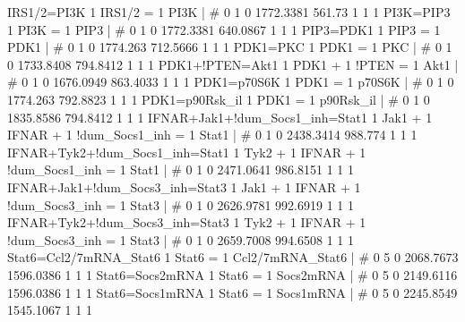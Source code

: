 IRS1/2=PI3K                                         	1 IRS1/2 = 1 PI3K 	| 	# 	0              1              0      1772.3381         561.73              1              1              1 
PI3K=PIP3                                           	1 PI3K = 1 PIP3 	| 	# 	0              1              0      1772.3381       640.0867              1              1              1 
PIP3=PDK1                                           	1 PIP3 = 1 PDK1 	| 	# 	0              1              0       1774.263       712.5666              1              1              1 
PDK1=PKC                                            	1 PDK1 = 1 PKC 	| 	# 	0              1              0      1733.8408       794.8412              1              1              1 
PDK1+!PTEN=Akt1                                     	1 PDK1 + 1 !PTEN = 1 Akt1 	| 	# 	0              1              0      1676.0949       863.4033              1              1              1 
PDK1=p70S6K                                         	1 PDK1 = 1 p70S6K 	| 	# 	0              1              0       1774.263       792.8823              1              1              1 
PDK1=p90Rsk_il                                      	1 PDK1 = 1 p90Rsk_il 	| 	# 	0              1              0      1835.8586       794.8412              1              1              1 
IFNAR+Jak1+!dum_Socs1_inh=Stat1                     	1 Jak1 + 1 IFNAR + 1 !dum_Socs1_inh = 1 Stat1 	| 	# 	0              1              0      2438.3414        988.774              1              1              1 
IFNAR+Tyk2+!dum_Socs1_inh=Stat1                     	1 Tyk2 + 1 IFNAR + 1 !dum_Socs1_inh = 1 Stat1 	| 	# 	0              1              0      2471.0641       986.8151              1              1              1 
IFNAR+Jak1+!dum_Socs3_inh=Stat3                     	1 Jak1 + 1 IFNAR + 1 !dum_Socs3_inh = 1 Stat3 	| 	# 	0              1              0      2626.9781       992.6919              1              1              1 
IFNAR+Tyk2+!dum_Socs3_inh=Stat3                     	1 Tyk2 + 1 IFNAR + 1 !dum_Socs3_inh = 1 Stat3 	| 	# 	0              1              0      2659.7008       994.6508              1              1              1 
Stat6=Ccl2/7mRNA_Stat6                              	1 Stat6 = 1 Ccl2/7mRNA_Stat6 	| 	# 	0              5              0      2068.7673      1596.0386              1              1              1 
Stat6=Socs2mRNA                                     	1 Stat6 = 1 Socs2mRNA 	| 	# 	0              5              0      2149.6116      1596.0386              1              1              1 
Stat6=Socs1mRNA                                     	1 Stat6 = 1 Socs1mRNA 	| 	# 	0              5              0      2245.8549      1545.1067              1              1              1 
